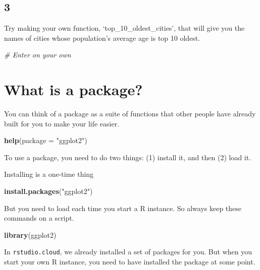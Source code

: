 \documentclass[]{book}
\newenvironment{Shaded}{\begin{snugshade}}{\end{snugshade}}
\newcommand{\CommentTok}[1]{\textcolor[rgb]{0.56,0.35,0.01}{\textit{#1}}}
\newcommand{\DataTypeTok}[1]{\textcolor[rgb]{0.13,0.29,0.53}{#1}}
\newcommand{\KeywordTok}[1]{\textcolor[rgb]{0.13,0.29,0.53}{\textbf{#1}}}
\newcommand{\NormalTok}[1]{#1}
\newcommand{\StringTok}[1]{\textcolor[rgb]{0.31,0.60,0.02}{#1}}
\theoremstyle{definition}
\theoremstyle{definition}
\theoremstyle{definition}
\theoremstyle{remark}
\begin{document}
\hypertarget{section-16}{%
\subsection*{3}\label{section-16}}

Try making your own function, `top\_10\_oldest\_cities', that will give you the names of cities whose population's average age is top 10 oldest.

\begin{Shaded}
\begin{Highlighting}[]
\CommentTok{# Enter on your own}
\end{Highlighting}
\end{Shaded}

\hypertarget{what-is-a-package}{%
\section{What is a package?}\label{what-is-a-package}}

You can think of a package as a suite of functions that other people have already built for you to make your life easier.

\begin{Shaded}
\begin{Highlighting}[]
\KeywordTok{help}\NormalTok{(}\DataTypeTok{package =} \StringTok{"ggplot2"}\NormalTok{)}
\end{Highlighting}
\end{Shaded}

To use a package, you need to do two things: (1) install it, and then (2) load it.

Installing is a one-time thing

\begin{Shaded}
\begin{Highlighting}[]
\KeywordTok{install.packages}\NormalTok{(}\StringTok{"ggplot2"}\NormalTok{)}
\end{Highlighting}
\end{Shaded}

But you need to load each time you start a R instance. So always keep these commands on a script.

\begin{Shaded}
\begin{Highlighting}[]
\KeywordTok{library}\NormalTok{(ggplot2)}
\end{Highlighting}
\end{Shaded}

In \texttt{rstudio.cloud}, we already installed a set of packages for you. But when you start your own R instance, you need to have installed the package at some point.
\end{document}

